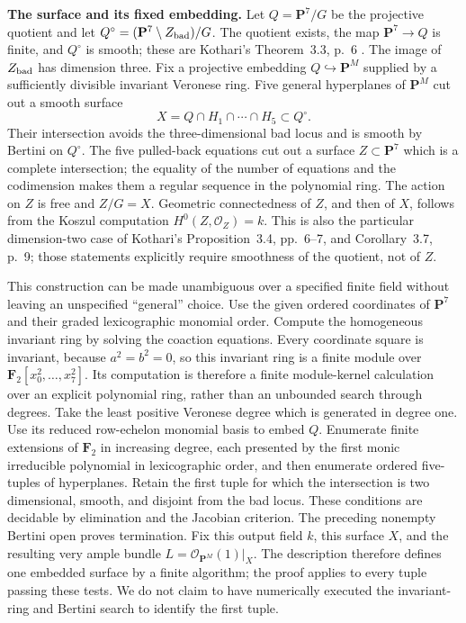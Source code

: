 \par\smallskip\noindent\textbf{The surface and its fixed embedding.}
Let $Q=\mathbf P^7/G$ be the projective quotient and let
$Q^\circ=(\mathbf P^7\setminus Z_{\rm bad})/G$.  The quotient exists,
the map $\mathbf P^7\to Q$ is finite, and $Q^\circ$ is smooth;
these are Kothari's Theorem~3.3, p.~6
\cite{Kothari2026}.  The image of $Z_{\rm bad}$ has dimension three.
Fix a projective embedding $Q\hookrightarrow\mathbf P^M$ supplied
by a sufficiently divisible invariant Veronese ring.  Five general
hyperplanes of $\mathbf P^M$ cut out a smooth surface
\[
 X=Q\cap H_1\cap\cdots\cap H_5\subset Q^\circ.
\]
Their intersection avoids the three-dimensional bad locus and is
smooth by Bertini on $Q^\circ$.  The five pulled-back equations cut
out a surface $Z\subset\mathbf P^7$ which is a complete intersection;
the equality of the number of equations and the codimension makes
them a regular sequence in the polynomial ring.  The action on $Z$
is free and $Z/G=X$.  Geometric connectedness of $Z$, and then of
$X$, follows from the Koszul computation $H^0(Z,\mathcal O_Z)=k$.
This is also the particular dimension-two case of Kothari's
Proposition~3.4, pp.~6--7, and Corollary~3.7, p.~9; those statements
explicitly require smoothness of the quotient, not of $Z$.

This construction can be made unambiguous over a specified finite
field without leaving an unspecified ``general'' choice.  Use the
given ordered coordinates of $\mathbf P^7$ and their graded
lexicographic monomial order.  Compute the homogeneous invariant
ring by solving the coaction equations.  Every coordinate square is
invariant, because $a^2=b^2=0$, so this invariant ring is a finite
module over $\mathbf F_2[x_0^2,\ldots,x_7^2]$.  Its computation is
therefore a finite module-kernel calculation over an explicit
polynomial ring, rather than an unbounded search through degrees.
Take the least positive
Veronese degree which is generated in degree one.  Use its reduced
row-echelon monomial basis to embed $Q$.  Enumerate finite extensions
of $\mathbf F_2$ in increasing degree, each presented by the first
monic irreducible polynomial in lexicographic order, and then
enumerate ordered five-tuples of hyperplanes.  Retain the first
tuple for which the intersection is two dimensional, smooth, and
disjoint from the bad locus.  These conditions are decidable by
elimination and the Jacobian criterion.  The preceding nonempty
Bertini open proves termination.  Fix this output field $k$, this
surface $X$, and the resulting very ample bundle
$L=\mathcal O_{\mathbf P^M}(1)|_X$.
The description therefore defines one embedded surface by a finite
algorithm; the proof applies to every tuple passing these tests.
We do not claim to have numerically executed the invariant-ring and
Bertini search to identify the first tuple.

